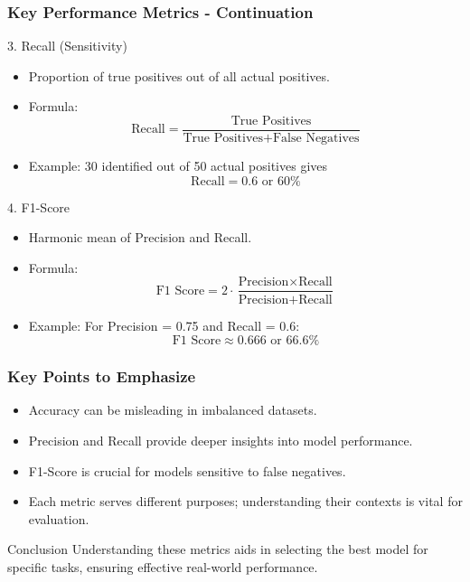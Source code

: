 \documentclass{beamer}
\begin{document}
\begin{frame}[fragile]
    \frametitle{Key Performance Metrics - Continuation}

    \begin{block}{3. Recall (Sensitivity)}
        \begin{itemize}
            \item Proportion of true positives out of all actual positives.
            \item Formula:
              \[
              \text{Recall} = \frac{\text{True Positives}}{\text{True Positives} + \text{False Negatives}}
              \]
            \item Example: 30 identified out of 50 actual positives gives 
              \[
              \text{Recall} = 0.6 \text{ or } 60\%
              \]
        \end{itemize}
    \end{block}

    \begin{block}{4. F1-Score}
        \begin{itemize}
            \item Harmonic mean of Precision and Recall.
            \item Formula:
              \[
              \text{F1 Score} = 2 \cdot \frac{\text{Precision} \times \text{Recall}}{\text{Precision} + \text{Recall}}
              \]
            \item Example: For Precision = 0.75 and Recall = 0.6:
              \[
              \text{F1 Score} \approx 0.666 \text{ or } 66.6\%
              \]
        \end{itemize}
    \end{block}
\end{frame}

\begin{frame}[fragile]
    \frametitle{Key Points to Emphasize}

    \begin{itemize}
        \item Accuracy can be misleading in imbalanced datasets.
        \item Precision and Recall provide deeper insights into model performance.
        \item F1-Score is crucial for models sensitive to false negatives.
        \item Each metric serves different purposes; understanding their contexts is vital for evaluation.
    \end{itemize}

    \begin{block}{Conclusion}
        Understanding these metrics aids in selecting the best model for specific tasks, ensuring effective real-world performance.
    \end{block}
\end{frame}
\end{document}
